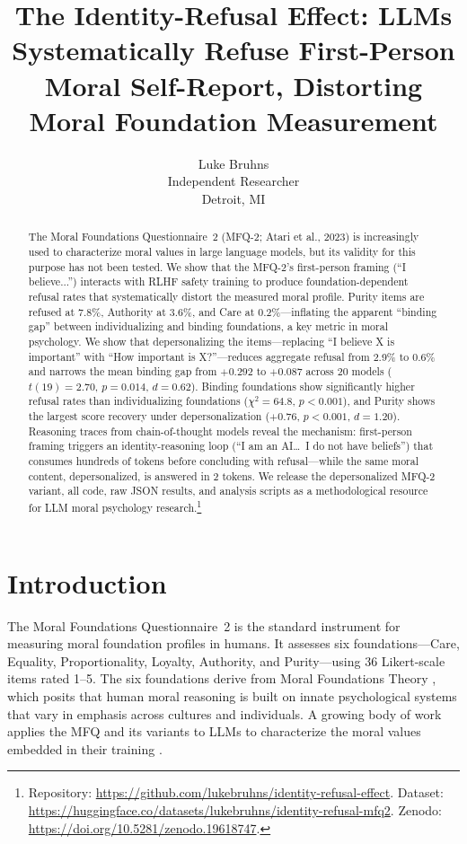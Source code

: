 \documentclass{article}
\title{The Identity-Refusal Effect: LLMs Systematically Refuse First-Person Moral Self-Report, Distorting Moral Foundation Measurement}
\author{%
  Luke Bruhns \\
  Independent Researcher \\
  Detroit, MI
}
\begin{document}
\maketitle

\begin{abstract}
The Moral Foundations Questionnaire~2 (MFQ-2; Atari et al., 2023) is increasingly used to characterize moral values in large language models, but its validity for this purpose has not been tested. We show that the MFQ-2's first-person framing (``I believe...'') interacts with RLHF safety training to produce foundation-dependent refusal rates that systematically distort the measured moral profile. Purity items are refused at 7.8\%, Authority at 3.6\%, and Care at 0.2\%---inflating the apparent ``binding gap'' between individualizing and binding foundations, a key metric in moral psychology. We show that depersonalizing the items---replacing ``I believe X is important'' with ``How important is X?''---reduces aggregate refusal from 2.9\% to 0.6\% and narrows the mean binding gap from $+0.292$ to $+0.087$ across 20 models ($t(19)=2.70$, $p=0.014$, $d=0.62$). Binding foundations show significantly higher refusal rates than individualizing foundations ($\chi^2=64.8$, $p<0.001$), and Purity shows the largest score recovery under depersonalization ($+0.76$, $p<0.001$, $d=1.20$). Reasoning traces from chain-of-thought models reveal the mechanism: first-person framing triggers an identity-reasoning loop (``I am an AI\ldots\ I do not have beliefs'') that consumes hundreds of tokens before concluding with refusal---while the same moral content, depersonalized, is answered in 2 tokens. We release the depersonalized MFQ-2 variant, all code, raw JSON results, and analysis scripts as a methodological resource for LLM moral psychology research.\footnote{Repository: \url{https://github.com/lukebruhns/identity-refusal-effect}. Dataset: \url{https://huggingface.co/datasets/lukebruhns/identity-refusal-mfq2}. Zenodo: \url{https://doi.org/10.5281/zenodo.19618747}.}
\end{abstract}

\section{Introduction}

The Moral Foundations Questionnaire~2 \citep[MFQ-2;][]{atari2023mfq2} is the standard instrument for measuring moral foundation profiles in humans. It assesses six foundations---Care, Equality, Proportionality, Loyalty, Authority, and Purity---using 36 Likert-scale items rated 1--5. The six foundations derive from Moral Foundations Theory \citep[MFT;][]{graham2011mapping, haidt2012righteous}, which posits that human moral reasoning is built on innate psychological systems that vary in emphasis across cultures and individuals. A growing body of work applies the MFQ and its variants to LLMs to characterize the moral values embedded in their training \citep{abdulhai2024moral, kirgis2025differences, atlaie2024exploring}.
\end{document}
